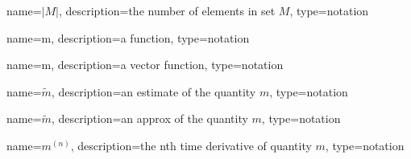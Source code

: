 	\newcommand{\cardinality}[1]{\ensuremath{\left|#1\right|}}
	{%
		name=\cardinality{M},
		description=the number of elements in set $M$,
		type=notation
	}

	\newcommand{\func}[1]{\ensuremath{\mathrm{#1}}}
	{%
		name=\func{m},
		description=a function,
		type=notation
	}

	\newcommand{\vecfunc}[1]{\ensuremath{\boldsymbol{\mathrm{#1}}}}
	{%
		name=\vecfunc{m},
		description=a vector function,
		type=notation
	}

	\newcommand{\estimate}[1]{\ensuremath{\widetilde{#1}}}
	{%
		name=\estimate{m},
		description=an estimate of the quantity $m$,
		type=notation
	}

	\newcommand{\approximation}[1]{\ensuremath{\widetilde{#1}}}
	{%
		name=\approximation{m},
		description=an approx of the quantity $m$,
		type=notation
	}

	\newcommand{\tdern}[2]{\ensuremath{{#1}^{(#2)}}}
	{%
		name=\tdern{m}{n},
		description=the nth time derivative of quantity $m$,
		type=notation
	}


